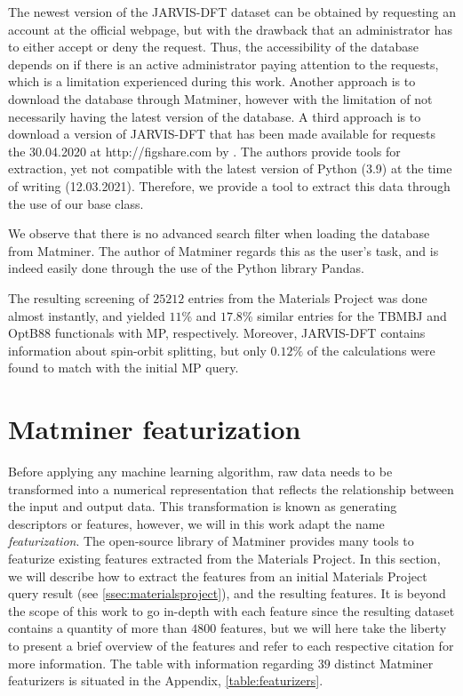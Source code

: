 The newest version of the JARVIS-DFT \cite{Choudhary2020} dataset can be obtained by requesting an account at the official webpage, but with the drawback that an administrator has to either accept or deny the request. Thus, the accessibility of the database depends on if there is an active administrator paying attention to the requests, which is a limitation experienced during this work. Another approach is to download the database through Matminer, however with the limitation of not necessarily having the latest version of the database. A third approach is to download a version of JARVIS-DFT that has been made available for requests the 30.04.2020 at http://figshare.com by \citeauthor{Choudhary2020} \cite{Choudhary2020}. The authors provide tools for extraction, yet not compatible with the latest version of Python (3.9) at the time of writing (12.03.2021). Therefore, we provide a tool to extract this data through the use of our base class.



\noindent We observe that there is no advanced search filter when loading the database from Matminer. The author of Matminer regards this as the user's task, and is indeed easily done through the use of the Python library Pandas.

The resulting screening of $25212$ entries from the Materials Project was done almost instantly, and yielded $11$\% and $17.8$\% similar entries for the TBMBJ and OptB88 functionals with MP, respectively. Moreover, JARVIS-DFT contains information about spin-orbit splitting, but only $0.12\%$ of the calculations were found to match with the initial MP query.

\section{Matminer featurization}

Before applying any machine learning algorithm, raw data needs to be transformed into a numerical representation that reflects the relationship between the input and output data. This transformation is known as generating descriptors or features, however, we will in this work adapt the name \textit{featurization}. The open-source library of Matminer provides many tools to featurize existing features extracted from the Materials Project. In this section, we will describe how to extract the features from an initial Materials Project query result (see \autoref{ssec:materialsproject}), and the resulting features. It is beyond the scope of this work to go in-depth with each feature since the resulting dataset contains a quantity of more than $4800$ features, but we will here take the liberty to present a brief overview of the features and refer to each respective citation for more information. The table with information regarding $39$ distinct Matminer featurizers is situated in the Appendix, \autoref{table:featurizers}.

